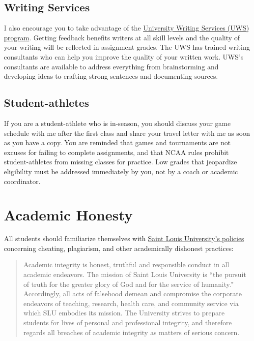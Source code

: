 \documentclass[]{book}
\begin{document}
\hypertarget{writing-services}{%
\subsection{Writing Services}\label{writing-services}}

I also encourage you to take advantage of the \href{https://www.slu.edu/life-at-slu/student-success-center/academic-support/university-writing-services/index.php}{University Writing Services (UWS) program}. Getting feedback benefits writers at all skill levels and the quality of your writing will be reflected in assignment grades. The UWS has trained writing consultants who can help you improve the quality of your written work. UWS's consultants are available to address everything from brainstorming and developing ideas to crafting strong sentences and documenting sources.

\hypertarget{student-athletes}{%
\subsection{Student-athletes}\label{student-athletes}}

If you are a student-athlete who is in-season, you should discuss your game schedule with me after the first class and share your travel letter with me as soon as you have a copy. You are reminded that games and tournaments are not excuses for failing to complete assignments, and that NCAA rules prohibit student-athletes from missing classes for practice. Low grades that jeopardize eligibility must be addressed immediately by you, not by a coach or academic coordinator.

\hypertarget{academic-honesty}{%
\section{Academic Honesty}\label{academic-honesty}}

All students should familiarize themselves with \href{http://www.slu.edu/Documents/provost/academic_affairs/Academic\%20Integrity\%20Policy\%20FINAL\%20\%206-26-15.pd}{Saint Louis University's policies} concerning cheating, plagiarism, and other academically dishonest practices:

\begin{quote}
Academic integrity is honest, truthful and responsible conduct in all academic endeavors. The mission of Saint Louis University is ``the pursuit of truth for the greater glory of God and for the service of humanity.'' Accordingly, all acts of falsehood demean and compromise the corporate endeavors of teaching, research, health care, and community service via which SLU embodies its mission. The University strives to prepare students for lives of personal and professional integrity, and therefore regards all breaches of academic integrity as matters of serious concern.
\end{quote}
\end{document}
